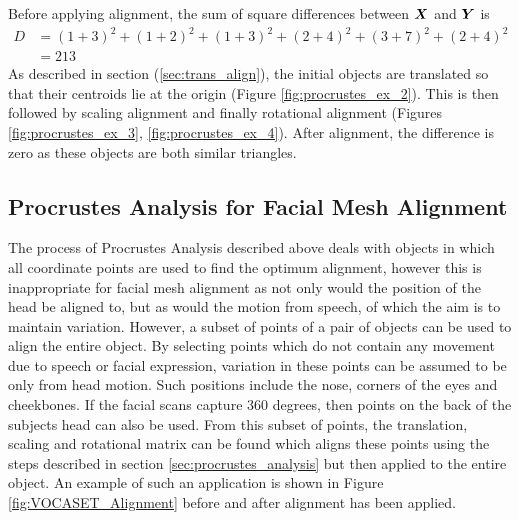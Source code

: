 Before applying alignment, the sum of square differences between ${\boldsymbol{{X}}}$ and ${\boldsymbol{{Y}}}$ is
\begin{align*}
    D& = {(1+3)^2 + (1+2)^2} + {(1+3)^2 + (2+4)^2} + {(3+7)^2 + (2+4)^2} \\
     & = 213
\end{align*}
As described in section (\ref{sec:trans_align}), the initial objects are translated so that their centroids lie at the origin (Figure \ref{fig:procrustes_ex_2}). This is then followed by scaling alignment and finally rotational alignment (Figures \ref{fig:procrustes_ex_3}, \ref{fig:procrustes_ex_4}).
After alignment, the difference is zero as these objects are both similar triangles.

\subsection{Procrustes Analysis for Facial Mesh Alignment}
The process of Procrustes Analysis described above deals with objects in which all coordinate points are used to find the optimum alignment, however this is inappropriate for facial mesh alignment as not only would the position of the head be aligned to, but as would the motion from speech, of which the aim is to maintain variation.
However, a subset of points of a pair of objects can be used to align the entire object.
By selecting points which do not contain any movement due to speech or facial expression, variation in these points can be assumed to be only from head motion.
Such positions include the nose, corners of the eyes and cheekbones.
If the facial scans capture 360 degrees, then points on the back of the subjects head can also be used.
From this subset of points, the translation, scaling and rotational matrix can be found which aligns these points using the steps described in section \ref{sec:procrustes_analysis} but then applied to the entire object.
An example of such an application is shown in Figure \ref{fig:VOCASET_Alignment} before and after alignment has been applied.

%
%
%